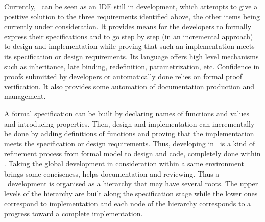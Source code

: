 Currently, \focal\  can be seen as an IDE still in development, which
attempts to give a positive solution to the three requirements
identified above, the other items being currently under consideration.
It provides means for the developers to formally express their
specifications and to go step by step (in an incremental approach) to
design and implementation while proving that such an implementation
meets its specification or design requirements. Its language offers
high level mechanisms such as inheritance, late binding, redefinition,
parametrization, etc.  Confidence in proofs submitted by developers or
automatically done relies on formal proof verification.  It also
provides some automation of documentation production and management. 

A formal specification can be built by declaring names of functions
and values and introducing
properties. Then, design and implementation can incrementally be done
by adding definitions of functions and proving that the implementation
meets the specification or design requirements. Thus, developing in
\focal\ is a kind of refinement process from  formal model to design
and code, completely done within \focal. Taking the global development
in consideration within a same environment brings some conciseness,
helps documentation and reviewing.
Thus a \focal\ development is organised as a hierarchy that may have
several roots. The upper levels of the hierarchy are built along the
specification stage while the lower ones correspond to
implementation and each  node of the hierarchy corresponds to a progress
toward a complete implementation. 


\bigskip

